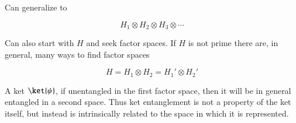 Can generalize to 

\begin{equation}\label{eqn:qmTwoL1:370}
H_1 \otimes H_2 \otimes H_3 \otimes \cdots
\end{equation}

Can also start with $H$ and seek factor spaces.  If $H$ is not prime there are, in general, many ways to find factor spaces

\begin{equation}\label{eqn:qmTwoL1:390}
H = 
H_1 \otimes H_2 =
H_1' \otimes H_2'
\end{equation}

A ket $\ket{\psi}$, if unentangled in the first factor space, then it will be in general entangled in a second space.  Thus ket entanglement is not a property of the ket itself, but instead is intrinsically related to the space in which it is represented.

\EndArticle
